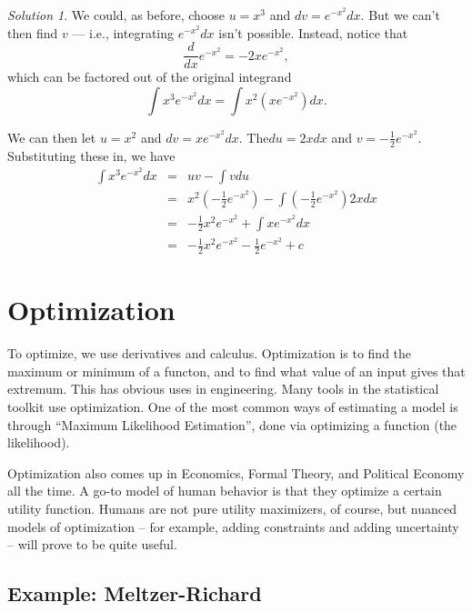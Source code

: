 \documentclass[
]{book}
\theoremstyle{definition}
\theoremstyle{definition}
\theoremstyle{definition}
\theoremstyle{remark}
\newtheorem*{solution}{Solution}
\begin{document}
\begin{solution}
{}We could, as before, choose \(u=x^3\) and \(dv=e^{-x^2}dx\). But we can't then find \(v\) --- i.e., integrating \(e^{-x^2}dx\) isn't possible. Instead, notice that \[\frac{d}{dx}e^{-x^2} = -2xe^{-x^2},\] which can be factored out of the original integrand \[\int x^3 e^{-x^2} dx = \int x^2 (xe^{-x^2})dx.\]

We can then let \(u=x^2\) and \(dv=x e^{-x^2}dx\). The\(du=2x dx\) and \(v=-\frac{1}{2}e^{-x^2}\). Substituting these in, we have
\begin{eqnarray}
                \int x^3 e^{-x^2} dx &=& u v - \int v du\nonumber\\
                &=& x^2 \left( -\frac{1}{2}e^{-x^2}\right) -\int \left(-\frac{1}{2}e^{-x^2}\right)2x dx\nonumber\\
                &=& -\frac{1}{2}x^2 e^{-x^2}+\int x e^{-x^2}dx\nonumber\\
                &=& -\frac{1}{2}x^2 e^{-x^2}-\frac{1}{2}e^{-x^2}+c\nonumber
\end{eqnarray}
\end{solution}

\hypertarget{optim}{%
\chapter{Optimization}\label{optim}}

To optimize, we use derivatives and calculus. Optimization is to find the maximum or minimum of a functon, and to find what value of an input gives that extremum. This has obvious uses in engineering. Many tools in the statistical toolkit use optimization. One of the most common ways of estimating a model is through ``Maximum Likelihood Estimation'', done via optimizing a function (the likelihood).

Optimization also comes up in Economics, Formal Theory, and Political Economy all the time. A go-to model of human behavior is that they optimize a certain utility function. Humans are not pure utility maximizers, of course, but nuanced models of optimization -- for example, adding constraints and adding uncertainty -- will prove to be quite useful.

\hypertarget{example-meltzer-richard}{%
\section*{Example: Meltzer-Richard}\label{example-meltzer-richard}}
\end{document}
